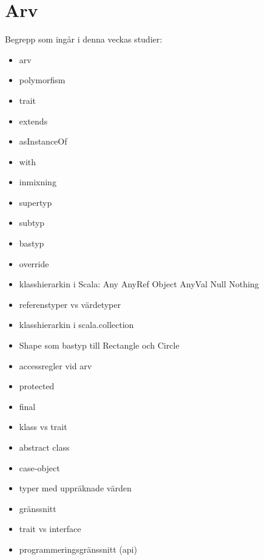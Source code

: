 \chapter{Arv}\label{chapter:W09}
Begrepp som ingår i denna veckas studier:
\begin{itemize}[noitemsep,label={$\square$},leftmargin=*]
\item arv
\item polymorfism
\item trait
\item extends
\item asInstanceOf
\item with
\item inmixning
\item supertyp
\item subtyp
\item bastyp
\item override
\item klasshierarkin i Scala: Any AnyRef Object AnyVal Null Nothing
\item referenstyper vs värdetyper
\item klasshierarkin i scala.collection
\item Shape som bastyp till Rectangle och Circle
\item accessregler vid arv
\item protected
\item final
\item klass vs trait
\item abstract class
\item case-object
\item typer med uppräknade värden
\item gränssnitt
\item trait vs interface
\item programmeringsgränssnitt (api)\end{itemize}
